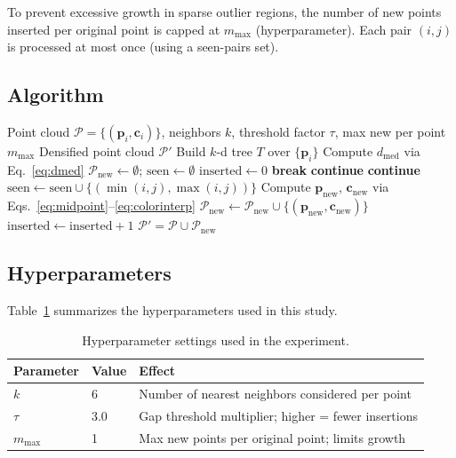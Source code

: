 \documentclass[12pt, a4paper]{article}
\begin{document}
To prevent excessive growth in sparse outlier regions, the number of new points
inserted per original point is capped at $m_\text{max}$ (hyperparameter). Each
pair $(i, j)$ is processed at most once (using a seen-pairs set).

\subsection{Algorithm}

\begin{algorithm}[H]
\caption{Neighbor-Interpolated Point Cloud Densification}
\label{alg:densify}
\begin{algorithmic}[1]
\Require Point cloud $\mathcal{P} = \{(\mathbf{p}_i, \mathbf{c}_i)\}$,
         neighbors $k$, threshold factor $\tau$, max new per point $m_\text{max}$
\Ensure Densified point cloud $\mathcal{P}'$
\State Build $k$-d tree $T$ over $\{\mathbf{p}_i\}$
\State Compute $d_\text{med}$ via Eq.~\eqref{eq:dmed}
\State $\mathcal{P}_\text{new} \leftarrow \emptyset$; $\text{seen} \leftarrow \emptyset$
    \State $\text{inserted} \leftarrow 0$
         \textbf{break} \EndIf
         \textbf{continue} \EndIf
         \textbf{continue} \EndIf
        \State $\text{seen} \leftarrow \text{seen} \cup \{(\min(i,j),\max(i,j))\}$
        \State Compute $\mathbf{p}_\text{new}$, $\mathbf{c}_\text{new}$ via Eqs.~\eqref{eq:midpoint}--\eqref{eq:colorinterp}
        \State $\mathcal{P}_\text{new} \leftarrow \mathcal{P}_\text{new} \cup \{(\mathbf{p}_\text{new}, \mathbf{c}_\text{new})\}$
        \State $\text{inserted} \leftarrow \text{inserted} + 1$
    \EndFor
\EndFor
\State \Return $\mathcal{P}' = \mathcal{P} \cup \mathcal{P}_\text{new}$
\end{algorithmic}
\end{algorithm}

\subsection{Hyperparameters}

Table~\ref{tab:hyperparams} summarizes the hyperparameters used in this study.

\begin{table}[h]
\centering
\caption{Hyperparameter settings used in the experiment.}
\label{tab:hyperparams}
\begin{tabular}{llp{7cm}}
\toprule
\textbf{Parameter} & \textbf{Value} & \textbf{Effect} \\
\midrule
$k$ & 6 & Number of nearest neighbors considered per point \\
$\tau$ & 3.0 & Gap threshold multiplier; higher = fewer insertions \\
$m_\text{max}$ & 1 & Max new points per original point; limits growth \\
\bottomrule
\end{tabular}
\end{table}
\end{document}
